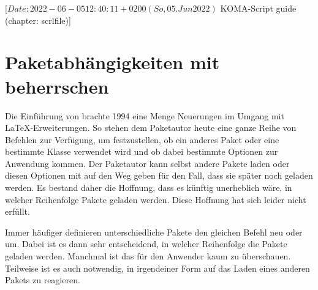 %
%
%
%
%
%
%

%
                 [$Date: 2022-06-05 12:40:11 +0200 (So, 05. Jun 2022) $
                  KOMA-Script guide (chapter: scrlfile)]

\chapter{Paketabhängigkeiten mit  
  beherrschen}

\BeginIndexGroup
{}

Die Einführung von \LaTeXe{} brachte 1994 eine Menge Neuerungen im Umgang mit
\LaTeX-Erweiterungen. So stehen dem Paketautor heute eine ganze Reihe von
Befehlen zur Verfügung, um festzustellen, ob ein anderes Paket oder eine
bestimmte Klasse verwendet wird und ob dabei bestimmte Optionen zur Anwendung
kommen. Der Paketautor kann selbst andere Pakete laden oder diesen Optionen
mit auf den Weg geben für den Fall, dass sie später noch geladen werden. Es
bestand daher die Hoffnung, dass es künftig unerheblich wäre, in welcher
Reihenfolge Pakete geladen werden. Diese Hoffnung hat sich leider nicht
erfüllt.

Immer häufiger definieren unterschiedliche Pakete den
gleichen Befehl neu oder um. Dabei ist es dann sehr entscheidend, in welcher
Reihenfolge die Pakete geladen werden. Manchmal ist das für den Anwender kaum
zu überschauen. Teilweise ist es auch notwendig, in irgendeiner Form auf das
Laden eines anderen Pakets zu reagieren.

